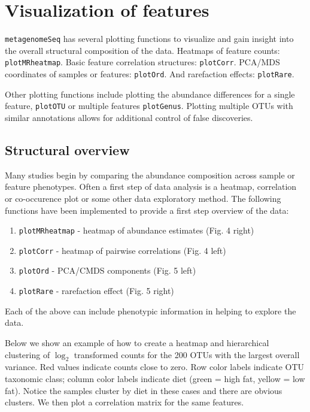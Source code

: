 \documentclass[a4paper,11pt]{article}\usepackage[]{graphicx}\usepackage[]{color}
\begin{document}
\newpage
\section{Visualization of features}

\texttt{metagenomeSeq} has several plotting functions to visualize and gain insight into the overall structural composition of the 
data. Heatmaps of feature counts: \texttt{plotMRheatmap}. Basic feature correlation structures: \texttt{plotCorr}. PCA/MDS coordinates of 
samples or features: \texttt{plotOrd}. And rarefaction effects: \texttt{plotRare}. 

Other plotting functions include plotting the abundance
differences for a single feature, \texttt{plotOTU} or multiple features
\texttt{plotGenus}. Plotting multiple OTUs with similar annotations allows for
additional control of false discoveries.

\subsection{Structural overview}
Many studies begin by comparing the abundance composition across 
sample or feature phenotypes. Often a first step of data analysis is a 
heatmap, correlation or co-occurence plot or some other data exploratory method. 
The following functions have been implemented to provide a first step overview 
of the data:


\begin{enumerate}
\item \texttt{plotMRheatmap} - heatmap of abundance estimates (Fig. 4 right)
\item \texttt{plotCorr} - heatmap of pairwise correlations (Fig. 4 left)
\item \texttt{plotOrd} - PCA/CMDS components (Fig. 5 left)
\item \texttt{plotRare} - rarefaction effect (Fig. 5 right)
\end{enumerate}

\noindent
Each of the above can include phenotypic information in helping to explore the data.

Below we show an example of how to create a heatmap and hierarchical clustering of $\log_2$ 
transformed counts for the 200 OTUs with the largest overall variance. 
Red values indicate counts close to zero. Row color labels indicate OTU 
taxonomic class; column color labels indicate diet (green = high fat, 
yellow = low fat). Notice the samples cluster by diet in these cases 
and there are obvious clusters. We then plot a correlation matrix for the same features.
\end{document}

